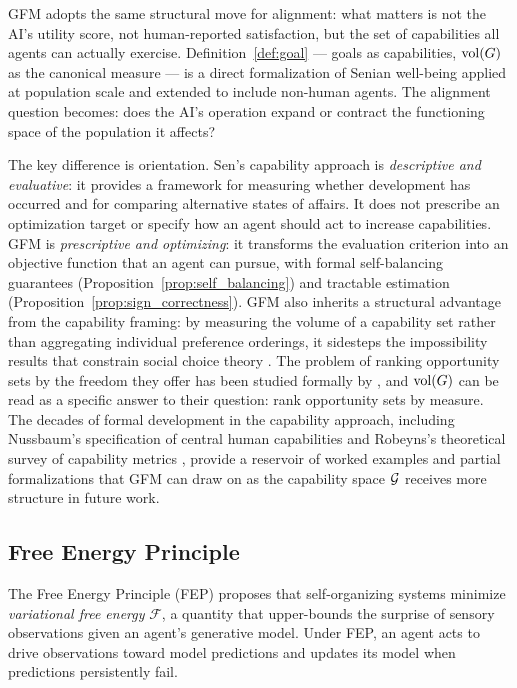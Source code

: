 GFM adopts the same structural move for alignment: what matters is not the AI's
utility score, not human-reported satisfaction, but the set of capabilities all
agents can actually exercise. Definition~\ref{def:goal} --- goals as
capabilities, $\operatorname{vol}(G)$ as the canonical measure --- is a direct formalization
of Senian well-being applied at population scale and extended to include
non-human agents. The alignment question becomes: does the AI's operation
expand or contract the functioning space of the population it affects?

The key difference is orientation. Sen's capability approach is
\emph{descriptive and evaluative}: it provides a framework for measuring
whether development has occurred and for comparing alternative states of
affairs. It does not prescribe an optimization target or specify how an agent
should act to increase capabilities. GFM is \emph{prescriptive and optimizing}:
it transforms the evaluation criterion into an objective function that an agent
can pursue, with formal self-balancing guarantees
(Proposition~\ref{prop:self_balancing}) and tractable estimation
(Proposition~\ref{prop:sign_correctness}). GFM also inherits a structural advantage from the capability framing: by
measuring the volume of a capability set rather than aggregating individual
preference orderings, it sidesteps the impossibility results that constrain
social choice theory \citep{arrow1951social}. The problem of ranking
opportunity sets by the freedom they offer has been studied formally by
\citet{pattanaik1990ranking}, and $\operatorname{vol}(G)$ can be read as a specific answer to
their question: rank opportunity sets by measure. The decades of formal
development in the capability approach, including Nussbaum's specification of
central human capabilities \citep{nussbaum2000women} and Robeyns's theoretical
survey of capability metrics \citep{robeyns2005capability}, provide a reservoir
of worked examples and partial formalizations that GFM can draw on as the
capability space $\mathcal{G}$ receives more structure in future work.

\subsection{Free Energy Principle}
\label{sec:connections_fep}

The Free Energy Principle (FEP) \citep{friston2013life} proposes that
self-organizing systems minimize \emph{variational free energy} $\mathcal{F}$,
a quantity that upper-bounds the surprise of sensory observations given an
agent's generative model. Under FEP, an agent acts to drive observations toward
model predictions and updates its model when predictions persistently fail.

